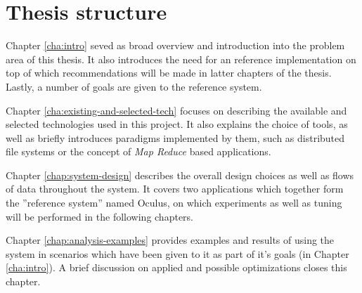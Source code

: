 %
%


\section{Thesis structure}
Chapter \ref{cha:intro} seved as broad overview and introduction into the problem area of this thesis. It also introduces the need for an reference implementation on top of which recommendations will be made in latter chapters of the thesis. Lastly, a number of goals are given to the reference system.

Chapter \ref{cha:existing-and-selected-tech} focuses on describing the available and selected technologies used in this project. It also explains the choice of tools, as well as briefly introduces paradigms implemented by them, such as distributed file systems or the concept of \textit{Map Reduce} \cite{map-reduce} based applications.

Chapter \ref{chap:system-design} describes the overall design choices as well as flows of data throughout the system. It covers two applications which together form the ''reference system'' named Oculus, on which experiments as well as tuning will be performed in the following chapters.

Chapter \ref{chap:analysis-examples} provides examples and results of using the system in scenarios which have been given to it as part of it's goals (in Chapter \ref{cha:intro}). A brief discussion on applied and possible optimizations closes this chapter.

